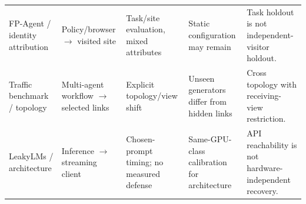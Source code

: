 \begin{table}[t]
\begin{tabularx}{\textwidth}{@{}p{}p{}p{}YY@{}}
FP-Agent / identity attribution & Policy/browser $\to$ visited site & Task/site evaluation, mixed attributes & Static configuration may remain & Task holdout is not independent-visitor holdout.\\
Traffic benchmark / topology & Multi-agent workflow $\to$ selected links & Explicit topology/view shift & Unseen generators differ from hidden links & Cross topology with receiving-view restriction.\\
LeakyLMs / architecture & Inference $\to$ streaming client & Chosen-prompt timing; no measured defense & Same-GPU-class calibration for architecture & API reachability is not hardware-independent recovery.\\\bottomrule
\end{tabularx}\end{table}
